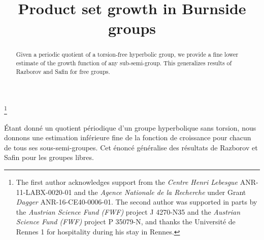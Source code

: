\documentclass[JEP,XML,SOM,Unicode, NoEqCountersInSection,published]{cedram}
\theoremstyle{plain}
\theoremstyle{definition}
\begin{document}
\frontmatter
\title{Product set growth in Burnside groups}

\author[\initial{R.} \lastname{Coulon}]{ }
\address{IRMAR, Univ Rennes et CNRS\\
35000 Rennes, France}

\author[\initial{M.} \lastname{Steenbock}]{ }
\address{Fakultät für Mathematik, Universität Wien\\
1090 Wien, Austria}

\thanks{The first author acknowledges support from the \emph{Centre Henri Lebesgue} ANR-11-LABX-0020-01 and the \emph{Agence Nationale de la Recherche} under Grant \emph{Dagger} ANR-16-CE40-0006-01. The second author was supported in parts by the \emph{Austrian Science Fund (FWF)} project J 4270-N35 and the \emph{Austrian Science Fund (FWF)} project P 35079-N, and thanks the Université de Rennes 1 for hospitality during his stay in Rennes.}

\begin{abstract}
Given a periodic quotient of a torsion-free hyperbolic group, we provide a fine lower estimate of the growth function of any sub-semi-group. This generalizes results of Razborov and Safin for free groups.
\end{abstract}





\begin{altabstract}
Étant donné un quotient périodique d'un groupe hyperbolique sans torsion, nous donnons une estimation inférieure fine de la fonction de croissance pour chacun de tous ses sous-semi-groupes. Cet énoncé généralise des résultats de Razborov et Safin pour les groupes libres.
\end{altabstract}

\maketitle
\vspace*{-\baselineskip}
\tableofcontents
\mainmatter
\end{document}
